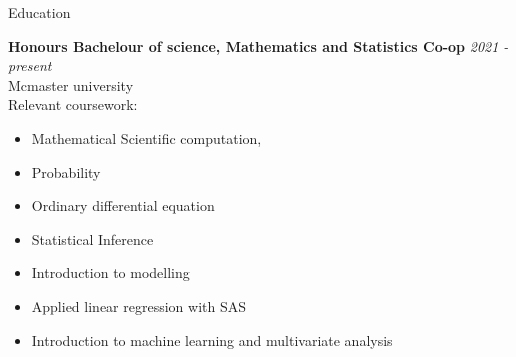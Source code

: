 \documentclass[
	11pt, %
]{resume} %
\begin{document}

\begin{rSection}{Education}
	
	\textbf{Honours Bachelour of science, Mathematics and Statistics Co-op} \hfill \textit{2021 - present} \\ 
	Mcmaster university \\
	Relevant coursework: \begin{itemize}
		\item Mathematical Scientific computation, 
		\item Probability
		\item Ordinary differential equation
		\item Statistical Inference
		\item Introduction to modelling
		\item Applied linear regression with SAS
		\item Introduction to machine learning and multivariate analysis
	\end{itemize}
	
\end{rSection}


\end{document}
